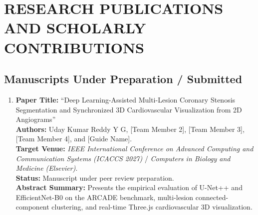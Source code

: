 \chapter{RESEARCH PUBLICATIONS AND SCHOLARLY CONTRIBUTIONS}
\label{app:appendix_c}

\section{Manuscripts Under Preparation / Submitted}

\begin{enumerate}
    \item \textbf{Paper Title:} ``Deep Learning-Assisted Multi-Lesion Coronary Stenosis Segmentation and Synchronized 3D Cardiovascular Visualization from 2D Angiograms''\\
    \textbf{Authors:} Uday Kumar Reddy Y G, [Team Member 2], [Team Member 3], [Team Member 4], and [Guide Name].\\
    \textbf{Target Venue:} \textit{IEEE International Conference on Advanced Computing and Communication Systems (ICACCS 2027)} / \textit{Computers in Biology and Medicine (Elsevier)}.\\
    \textbf{Status:} Manuscript under peer review preparation.\\
    \textbf{Abstract Summary:} Presents the empirical evaluation of U-Net++ and EfficientNet-B0 on the ARCADE benchmark, multi-lesion connected-component clustering, and real-time Three.js cardiovascular 3D visualization.
\end{enumerate}
